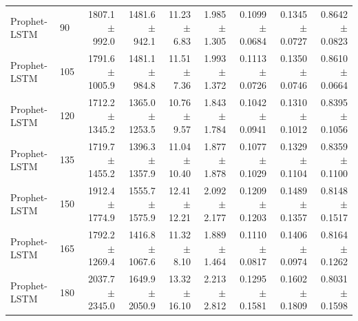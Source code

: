 \begin{table}[htbp]
\begin{tabular}{llrrrrrrr}
Prophet-LSTM & 90 & 1807.1 $\pm$ 992.0 & 1481.6 $\pm$ 942.1 & 11.23 $\pm$ 6.83 & 1.985 $\pm$ 1.305 & 0.1099 $\pm$ 0.0684 & 0.1345 $\pm$ 0.0727 & 0.8642 $\pm$ 0.0823 \\
Prophet-LSTM & 105 & 1791.6 $\pm$ 1005.9 & 1481.1 $\pm$ 984.8 & 11.51 $\pm$ 7.36 & 1.993 $\pm$ 1.372 & 0.1113 $\pm$ 0.0726 & 0.1350 $\pm$ 0.0746 & 0.8610 $\pm$ 0.0664 \\
Prophet-LSTM & 120 & 1712.2 $\pm$ 1345.2 & 1365.0 $\pm$ 1253.5 & 10.76 $\pm$ 9.57 & 1.843 $\pm$ 1.784 & 0.1042 $\pm$ 0.0941 & 0.1310 $\pm$ 0.1012 & 0.8395 $\pm$ 0.1056 \\
Prophet-LSTM & 135 & 1719.7 $\pm$ 1455.2 & 1396.3 $\pm$ 1357.9 & 11.04 $\pm$ 10.40 & 1.877 $\pm$ 1.878 & 0.1077 $\pm$ 0.1029 & 0.1329 $\pm$ 0.1104 & 0.8359 $\pm$ 0.1100 \\
Prophet-LSTM & 150 & 1912.4 $\pm$ 1774.9 & 1555.7 $\pm$ 1575.9 & 12.41 $\pm$ 12.21 & 2.092 $\pm$ 2.177 & 0.1209 $\pm$ 0.1203 & 0.1489 $\pm$ 0.1357 & 0.8148 $\pm$ 0.1517 \\
Prophet-LSTM & 165 & 1792.2 $\pm$ 1269.4 & 1416.8 $\pm$ 1067.6 & 11.32 $\pm$ 8.10 & 1.889 $\pm$ 1.464 & 0.1110 $\pm$ 0.0817 & 0.1406 $\pm$ 0.0974 & 0.8164 $\pm$ 0.1262 \\
Prophet-LSTM & 180 & 2037.7 $\pm$ 2345.0 & 1649.9 $\pm$ 2050.9 & 13.32 $\pm$ 16.10 & 2.213 $\pm$ 2.812 & 0.1295 $\pm$ 0.1581 & 0.1602 $\pm$ 0.1809 & 0.8031 $\pm$ 0.1598 \\
\bottomrule
\end{tabular}
\end{table}